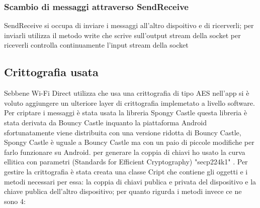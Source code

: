 \subsubsection{Scambio di messaggi attraverso SendReceive}
SendReceive si occupa di inviare i messaggi all'altro dispoitivo 
e di ricerverli;
per inviarli utilizza il metodo write che scrive 
sull'output stream della socket
per riceverli controlla continuamente l'input stream
della socket


\subsection{Crittografia usata}
Sebbene Wi-Fi Direct utilizza  che usa una crittografia di tipo 
AES \cite{Wi-FiProtected}
nell'app si è voluto aggiungere un ulteriore layer di crittografia 
implemetato a livello software.
Per criptare i messaggi è stata usata la libreria 
Spongy Castle \cite{Spongy} questa libreria è stata derivata
da Bouncy Castle inquanto  
la piattaforma Android sfortunatamente viene 
distribuita con una versione ridotta di Bouncy Castle, 
Spongy Castle è uguale a Bouncy Castle 
ma con un paio di piccole modifiche per farlo funzionare su Android.
per generare la coppia di chiavi ho usato la curva ellitica con parametri 
(Standards for Efficient Cryptography)
"secp224k1" \cite{sec}.
Per gestire la crittografia è stata creata una classe Cript che contiene
gli oggetti e i metodi necessari per essa: la coppia di chiavi publica e privata 
del dispositivo e la chiave publica dell'altro dispositivo; per quanto rigurda i metodi
invece ce ne sono 4: 
